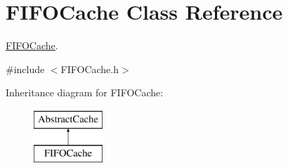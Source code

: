 \hypertarget{classFIFOCache}{\section{\-F\-I\-F\-O\-Cache \-Class \-Reference}
\label{classFIFOCache}
}


\hyperlink{classFIFOCache}{\-F\-I\-F\-O\-Cache}.  




{\ttfamily \#include $<$\-F\-I\-F\-O\-Cache.\-h$>$}

\-Inheritance diagram for \-F\-I\-F\-O\-Cache\-:\begin{figure}[H]
\begin{center}
\leavevmode
\includegraphics[height=2.000000cm]{classFIFOCache}
\end{center}
\end{figure}
